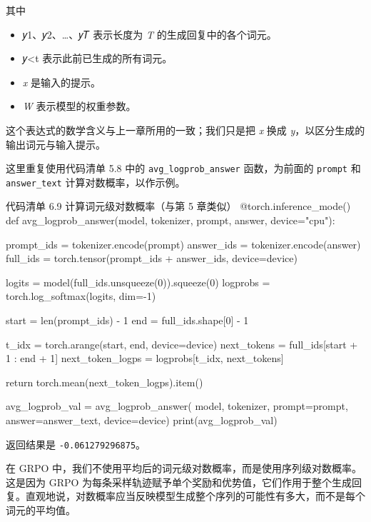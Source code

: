 
\begin{mySidebarBox}

其中

\begin{itemize}
\item 𝑦1、𝑦2、…、𝑦𝑇 表示长度为 \emph{T} 的生成回复中的各个词元。
\item 𝑦\textless{}t 表示此前已生成的所有词元。
\item \emph{x }是输入的提示。
\item \emph{W }表示模型的权重参数。
\end{itemize}

这个表达式的数学含义与上一章所用的一致；我们只是把 \emph{x} 换成 \emph{y}，以区分生成的输出词元与输入提示。

\end{mySidebarBox}

这里重复使用代码清单 5.8 中的 \texttt{avg\_logprob\_answer} 函数，为前面的 \texttt{prompt} 和 \texttt{answer\_text} 计算对数概率，以作示例。

\begin{codeboxt}{代码清单 6.9 计算词元级对数概率（与第 5 章类似）}
@torch.inference_mode()
def avg_logprob_answer(model, tokenizer, prompt, answer, device="cpu"):

    prompt_ids = tokenizer.encode(prompt)
    answer_ids = tokenizer.encode(answer)
    full_ids = torch.tensor(prompt_ids + answer_ids, device=device)

    logits = model(full_ids.unsqueeze(0)).squeeze(0)
    logprobs = torch.log_softmax(logits, dim=-1)

    start = len(prompt_ids) - 1
    end = full_ids.shape[0] - 1

    t_idx = torch.arange(start, end, device=device)
    next_tokens = full_ids[start + 1 : end + 1]
    next_token_logps = logprobs[t_idx, next_tokens]

    return torch.mean(next_token_logps).item()

avg_logprob_val = avg_logprob_answer(
                   model, tokenizer,
                   prompt=prompt,
                   answer=answer_text,
                   device=device)
print(avg_logprob_val)
\end{codeboxt}

返回结果是 \texttt{-0.061279296875}。

在 GRPO 中，我们不使用平均后的词元级对数概率，而是使用序列级对数概率。这是因为 GRPO 为每条采样轨迹赋予单个奖励和优势值，它们作用于整个生成回复。直观地说，对数概率应当反映模型生成整个序列的可能性有多大，而不是每个词元的平均值。

